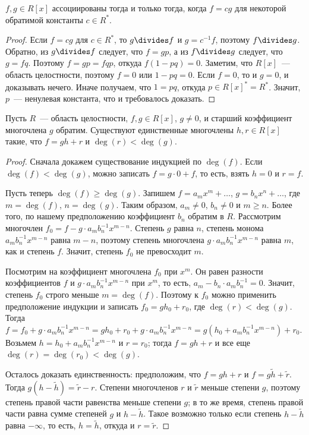 \begin{proposition}
$f,g\in R[x]$ ассоциированы тогда и только тогда, когда $f=cg$ для
некоторой обратимой константы $c\in R^*$.
\end{proposition}
\begin{proof}
Если $f=cg$ для $c\in R^*$, то $g\divides f$ и $g=c^{-1}f$, поэтому
$f\divides g$. Обратно, из $g\divides f$ следует, что $f=gp$, а из
$f\divides g$ следует, что $g=fq$. Поэтому $f=gp=fqp$, откуда
$f(1-pq)=0$. Заметим, что $R[x]$~--- область целостности, поэтому
$f=0$ или $1-pq=0$. Если
$f=0$, то и $g=0$, и доказывать нечего. Иначе получаем, что $1=pq$,
откуда $p\in R[x]^*=R^*$. Значит,
$p$~--- ненулевая константа, что и требовалось доказать.
\end{proof}

\begin{theorem}
Пусть $R$~--- область целостности, $f,g\in R[x]$, $g\neq 0$,
и старший коэффициент многочлена $g$ обратим. Существуют единственные
многочлены $h,r\in R[x]$ такие, что $f=gh+r$ и $\deg(r)<\deg(g)$.
\end{theorem}
\begin{proof}
Сначала докажем существование индукцией по $\deg(f)$. Если
$\deg(f)<\deg(g)$, можно записать $f=g\cdot 0+f$, то есть, взять $h=0$
и $r=f$.

Пусть теперь $\deg(f)\geq\deg(g)$. Запишем $f=a_mx^m+\dots$,
$g=b_nx^n+\dots$, где $m=\deg(f)$, $n=\deg(g)$. Таким образом,
$a_m\neq 0$, $b_n\neq 0$ и $m\geq n$. Более того, по нашему
предположению коэффициент $b_n$ обратим в $R$.
Рассмотрим многочлен
$f_0=f-g\cdot a_m b_n^{-1} x^{m-n}$. Степень $g$ равна $n$,
степень монома
$a_m b_n^{-1}x^{m-n}$ равна $m-n$, поэтому степень многочлена
$g\cdot a_m b_n^{-1}x^{m-n}$ равна $m$, как и степень $f$. Значит,
степень $f_0$ не превосходит $m$.

Посмотрим на коэффициент многочлена
$f_0$ при $x^m$. Он равен разности коэффициентов $f$ и
$g\cdot a_m b_n^{-1}x^{m-n}$ при $x^m$, то есть,
$a_m-b_n\cdot a_m b_n^{-1}=0$. Значит, степень $f_0$ строго
меньше $m=\deg(f)$. Поэтому к $f_0$ можно применить
предположение индукции и записать $f_0=gh_0+r_0$,
где $\deg(r)<\deg(g)$. Тогда $f=f_0+g\cdot a_m b_n^{-1}x^{m-n}
= gh_0+r_0+g\cdot a_m b_n^{-1}x^{m-n}
= g(h_0+a_mb_n^{-1}x^{m-n})+r_0$. Возьмем
$h=h_0+a_m b_n^{-1}x^{m-n}$ и $r=r_0$; тогда $f=gh+r$ и
все еще $\deg(r)=\deg(r_0)<\deg(g)$.

Осталось доказать единственность: предположим, что $f=gh+r$ и
$f=g\widetilde{h}+\widetilde{r}$. Тогда
$g(h-\widetilde{h})=\widetilde{r}-r$. Степени
многочленов $r$ и $\widetilde{r}$ меньше степени $g$, поэтому степень
правой части равенства меньше степени $g$; в то же время, степень
правой части равна сумме степеней $g$ и $h-\widetilde{h}$. Такое
возможно только если степень $h-\widetilde{h}$ равна $-\infty$, то
есть, $h=\widetilde{h}$, откуда и $r=\widetilde{r}$.
\end{proof}

